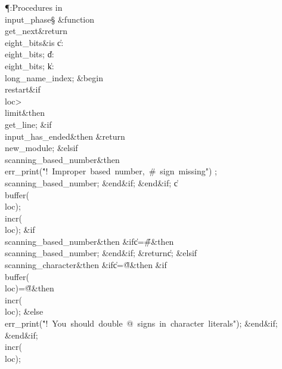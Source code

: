 \Y\P\?\4:Procedures in \\{input\_phase}\X\mathrel{+}\S\?\6
\&{function}\8\1\\{get\_next}\?\8\&{return}\?\8\\{eight\_bits}\2\8\&{is}\8%
\1\6
\|c\?:\?\\{eight\_bits};\6
\|d\?:\?\\{eight\_bits};\6
\|k\?:\?\\{long\_name\_index};\6
\4\&{begin}\6
\4\BL\\{restart}\EL\8\&{if}\1\1\8\\{loc}\?>\?\\{limit}\2\8\&{then}\6
\\{get\_line};\6
\&{if}\1\1\8\\{input\_has\_ended}\2\8\&{then}\6
\?\&{return}\?\8\\{new\_module};\6
\4\&{elsif}\1\8\\{scanning\_based\_number}\2\8\&{then}\6
\\{err\_print}\?\1(\?\.{"!\ Improper\ based\ number,\ \#\ sign\ missing"}\?\2)%
\?;\6
\\{scanning\_based\_number}\?\K\?;\2\6
\&{end}\8\2\&{if}\1;\2\6
\&{end}\8\2\&{if}\1;\6
\|c\?\K\?\\{buffer}\?\1(\?\\{loc}\?\2)\?;\5
\\{incr}\?\1(\?\\{loc}\?\2)\?;\6
\&{if}\1\1\8\\{scanning\_based\_number}\2\8\&{then}\6
\&{if}\1\1\8\|c\?=\?\H{\#}\2\8\&{then}\6
\\{scanning\_based\_number}\?\K\?;\2\6
\&{end}\8\2\&{if}\1;\6
\?\&{return}\?\8\|c;\6
\4\&{elsif}\1\8\\{scanning\_character}\2\8\&{then}\6
\&{if}\1\1\8\|c\?=\?\H{@}\2\8\&{then}\6
\&{if}\1\1\8\\{buffer}\?\1(\?\\{loc}\?\2)=\?\H{@}\2\8\&{then}\6
\\{incr}\?\1(\?\\{loc}\?\2)\?;\6
\4\&{else}\6
\\{err\_print}\?\1(\?\.{"!\ You\ should\ double\ @\ signs\ in\ character\
literals"}\?\2)\?;\2\6
\&{end}\8\2\&{if}\1;\2\6
\&{end}\8\2\&{if}\1;\6
\\{incr}\?\1(\?\\{loc}\?\2)\?;\5
